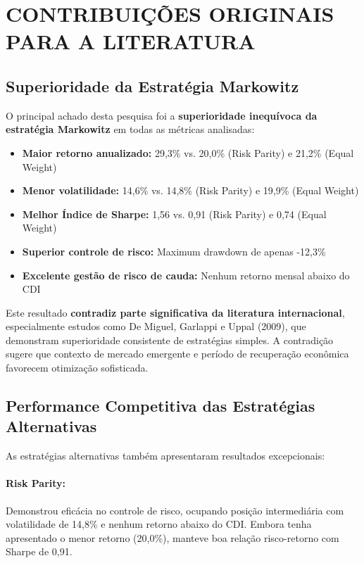 \section{CONTRIBUIÇÕES ORIGINAIS PARA A LITERATURA}

\subsection{Superioridade da Estratégia Markowitz}

O principal achado desta pesquisa foi a \textbf{superioridade inequívoca da estratégia Markowitz} em todas as métricas analisadas:

\begin{itemize}
    \item \textbf{Maior retorno anualizado:} 29,3\% vs. 20,0\% (Risk Parity) e 21,2\% (Equal Weight)
    \item \textbf{Menor volatilidade:} 14,6\% vs. 14,8\% (Risk Parity) e 19,9\% (Equal Weight)
    \item \textbf{Melhor Índice de Sharpe:} 1,56 vs. 0,91 (Risk Parity) e 0,74 (Equal Weight)
    \item \textbf{Superior controle de risco:} Maximum drawdown de apenas -12,3\%
    \item \textbf{Excelente gestão de risco de cauda:} Nenhum retorno mensal abaixo do CDI
\end{itemize}

Este resultado \textbf{contradiz parte significativa da literatura internacional}, especialmente estudos como De Miguel, Garlappi e Uppal (2009), que demonstram superioridade consistente de estratégias simples. A contradição sugere que contexto de mercado emergente e período de recuperação econômica favorecem otimização sofisticada.

\subsection{Performance Competitiva das Estratégias Alternativas}

As estratégias alternativas também apresentaram resultados excepcionais:

\paragraph{Risk Parity:} Demonstrou eficácia no controle de risco, ocupando posição intermediária com volatilidade de 14,8\% e nenhum retorno abaixo do CDI. Embora tenha apresentado o menor retorno (20,0\%), manteve boa relação risco-retorno com Sharpe de 0,91.


